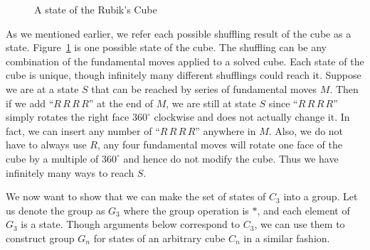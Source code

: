\begin{figure}[ht]
    \centering
    \begin{minipage}{0.48\textwidth}
        \centering
    \end{minipage}
    \begin{minipage}{0.48\textwidth}
        \centering
        \RubikCubeSolvedWY
        \vspace{0.5cm}
    \end{minipage}
    \begin{minipage}{0.99\textwidth}
        \centering
        \ShowSequence{}{\Rubik}{\SequenceLong}
    \end{minipage}
    \caption{A state of the Rubik's Cube}\label{fig:cube-state-example}
\end{figure}
\par As we mentioned earlier, we refer each possible shuffling result of the cube as a state. Figure~\ref{fig:cube-state-example} is one possible state of the cube. The shuffling can be any combination of the fundamental moves applied to a solved cube. Each state of the cube is unique, though infinitely many different shufflings could reach it. Suppose we are at a state $S$ that can be reached by series of fundamental moves $M$. Then if we add ``$R\,R\,R\,R$'' at the end of $M$, we are still at state $S$ since ``$R\,R\,R\,R$'' simply rotates the right face $360^\circ$ clockwise and does not actually change it. In fact, we can insert any number of ``$R\,R\,R\,R$'' anywhere in $M$. Also, we do not have to always use $R$, any four fundamental moves will rotate one face of the cube by a multiple of $360^\circ$ and hence do not modify the cube. Thus we have infinitely many ways to reach $S$.
\par We now want to show that we can make the set of states of $C_3$ into a group. Let us denote the group as $G_3$ where the group operation is $*$, and each element of $G_3$ is a state. Though arguments below correspond to $C_3$, we can use them to construct group $G_n$ for states of an arbitrary cube $C_n$ in a similar fashion. 

